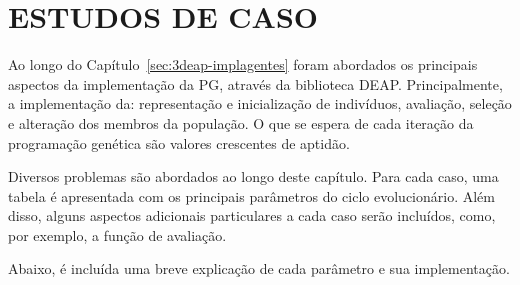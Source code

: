 \section{ESTUDOS DE CASO}\label{sec:4ec-estudosdecaso}

Ao longo do Capítulo~\ref{sec:3deap-implagentes} foram abordados os principais aspectos da implementação da PG, através da biblioteca DEAP. Principalmente, a implementação da: representação e inicialização de indivíduos, avaliação, seleção e alteração dos membros da população. O que se espera de cada iteração da programação genética são valores crescentes de aptidão.

Diversos problemas são abordados ao longo deste capítulo. Para cada caso, uma tabela é apresentada com os principais parâmetros do ciclo evolucionário. Além disso, alguns aspectos adicionais particulares a cada caso serão incluídos, como, por exemplo, a função de avaliação.

Abaixo, é incluída uma breve explicação de cada parâmetro e sua implementação.

